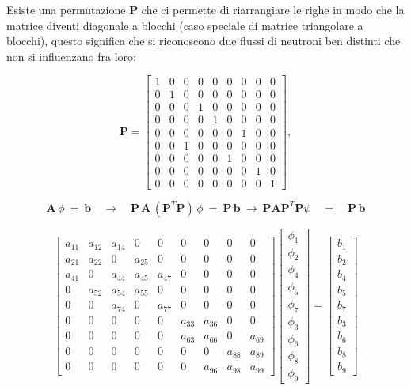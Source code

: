 Esiste una permutazione $\mathbf P$ che ci permette di riarrangiare le righe in modo che la matrice diventi diagonale a blocchi (caso speciale di matrice triangolare a blocchi), questo significa che si riconoscono due flussi di neutroni ben distinti che non si influenzano fra loro:

\[
\mathbf{P} =
\begin{bmatrix}
	1 & 0 & 0 & 0 & 0 & 0 & 0 & 0 & 0 \\
	0 & 1 & 0 & 0 & 0 & 0 & 0 & 0 & 0 \\
	0 & 0 & 0 & 1 & 0 & 0 & 0 & 0 & 0 \\
	0 & 0 & 0 & 0 & 1 & 0 & 0 & 0 & 0 \\
	0 & 0 & 0 & 0 & 0 & 0 & 1 & 0 & 0 \\
	0 & 0 & 1 & 0 & 0 & 0 & 0 & 0 & 0 \\
	0 & 0 & 0 & 0 & 0 & 1 & 0 & 0 & 0 \\
	0 & 0 & 0 & 0 & 0 & 0 & 0 & 1 & 0 \\
	0 & 0 & 0 & 0 & 0 & 0 & 0 & 0 & 1
\end{bmatrix},
\]

\[ \mathbf A\, \phi\ =\ \mathbf b\quad \rightarrow\quad \mathbf{P\,A}\,(\mathbf P^T \mathbf P)\,\phi\ =\ \mathbf{P\,b} \ \rightarrow\ \mathbf{PAP}^T \mathbf{P}\psi\quad =\quad \mathbf{P\, b} \]

\[
\begin{bmatrix}
	a_{11} & a_{12} & a_{14} & 0 & 0 & 0 & 0 & 0 & 0 \\
	a_{21} & a_{22} & 0 & a_{25} & 0 & 0 & 0 & 0 & 0 \\
	a_{41} & 0 & a_{44} & a_{45} & a_{47} & 0 & 0 & 0 & 0 \\
	0 & a_{52} & a_{54} & a_{55} & 0 & 0 & 0 & 0 & 0 \\
	0 & 0 & a_{74} & 0 & a_{77} & 0 & 0 & 0 & 0 \\
	0 & 0 & 0 & 0 & 0 & a_{33} & a_{36} & 0 & 0 \\
	0 & 0 & 0 & 0 & 0 & a_{63} & a_{66} & 0 & a_{69} \\
	0 & 0 & 0 & 0 & 0 & 0 & 0 & a_{88} & a_{89} \\
	0 & 0 & 0 & 0 & 0 & 0 & a_{96} & a_{98} & a_{99}
\end{bmatrix}
\begin{bmatrix}
	\phi_1 \\ \phi_2 \\ \phi_4 \\ \phi_5 \\ \phi_7 \\ \phi_3 \\ \phi_6 \\ \phi_8 \\ \phi_9
\end{bmatrix}
=
\begin{bmatrix}
	b_1 \\ b_2 \\ b_4 \\ b_5 \\ b_7 \\ b_3 \\ b_6 \\ b_8 \\ b_9
\end{bmatrix}
\]


